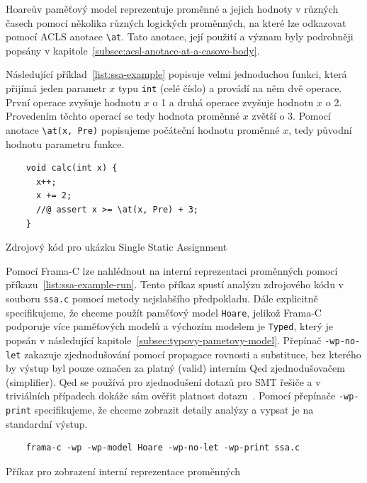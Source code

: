 Hoareův paměťový model reprezentuje proměnné a jejich hodnoty v různých časech
pomocí několika různých logických proměnných, na které lze odkazovat pomocí
ACLS anotace \texttt{\textbackslash at}.
Tato anotace, její použití a význam byly podrobněji popsány v kapitole~\ref{subsec:acsl-anotace-at-a-casove-body}.

Následující příklad~\ref{list:ssa-example} popisuje velmi jednoduchou funkci,
která přijímá jeden parametr $x$ typu \texttt{int} (celé číslo) a provádí na něm dvě operace.
První operace zvyšuje hodnotu $x$ o 1 a druhá operace zvyšuje hodnotu $x$ o 2.
Provedením těchto operací se tedy hodnota proměnné $x$ zvětší o 3.
Pomocí anotace \texttt{\textbackslash at(x, Pre)} popisujeme počáteční hodnotu proměnné $x$,
tedy původní hodnotu parametru funkce.

\begin{listing}[H]
    \begin{verbatim}
    void calc(int x) {
      x++;
      x += 2;
      //@ assert x >= \at(x, Pre) + 3;
    }
    \end{verbatim}
    \caption{Zdrojový kód pro ukázku Single Static Assignment}
    \label{list:ssa-example}
\end{listing}

Pomocí Frama\mbox{-}C lze nahlédnout na interní reprezentaci proměnných pomocí příkazu~\ref{list:ssa-example-run}.
Tento příkaz spustí analýzu zdrojového kódu v souboru \texttt{ssa.c} pomocí metody nejslabšího předpokladu.
Dále explicitně specifikujeme, že chceme použít paměťový model \texttt{Hoare},
jelikož Frama\mbox{-}C podporuje více paměťových modelů a výchozím modelem je \texttt{Typed},
který je popsán v následující kapitole~\ref{subsec:typovy-pametovy-model}.
Přepínač \texttt{-wp-no-let} zakazuje zjednodušování pomocí propagace rovnosti a substituce,
bez kterého by výstup byl pouze označen za platný (valid) interním Qed zjednodušovačem (simplifier).
Qed se používá pro zjednodušení dotazů pro SMT řešiče a v triviálních případech dokáže sám ověřit platnost dotazu~\cite{WPManual, BlanchardWP2024}.
Pomocí přepínače \texttt{-wp-print} specifikujeme, že chceme zobrazit detaily analýzy a vypsat je na standardní výstup.

\begin{listing}[H]
    \begin{verbatim}
    frama-c -wp -wp-model Hoare -wp-no-let -wp-print ssa.c
    \end{verbatim}
    \caption{Příkaz pro zobrazení interní reprezentace proměnných}
    \label{list:ssa-example-run}
\end{listing}

